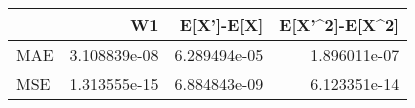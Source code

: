 \begin{tabular}{lrrr}
\toprule
{} &            W1 &    E[X']-E[X] &  E[X'\textasciicircum 2]-E[X\textasciicircum 2] \\
\midrule
MAE &  3.108839e-08 &  6.289494e-05 &    1.896011e-07 \\
MSE &  1.313555e-15 &  6.884843e-09 &    6.123351e-14 \\
\bottomrule
\end{tabular}
